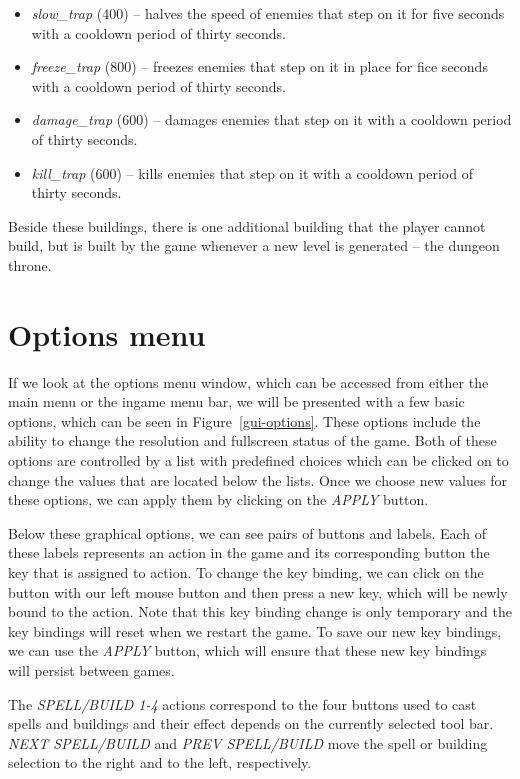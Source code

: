 \begin{itemize}
        \footnote{By \emph{cooldown period} we refer to the amount of time between two applications of the trap's effects.}
        of thirty seconds.
    \item \emph{slow\_trap} (400) -- halves the speed of enemies that step on it for five seconds with a cooldown period of thirty seconds.
    \item \emph{freeze\_trap} (800) -- freezes enemies that step on it in place for fice seconds with a cooldown period of thirty seconds.
    \item \emph{damage\_trap} (600) -- damages enemies that step on it with a cooldown period of thirty seconds.
    \item \emph{kill\_trap} (600) -- kills enemies that step on it with a cooldown period of thirty seconds.
\end{itemize}

Beside these buildings, there is one additional building that the player cannot build, but is built by the game whenever a new level is
generated -- the dungeon throne.

\section{Options menu}

If we look at the options menu window, which can be accessed from either the main menu or the ingame menu bar, we will be presented with a
few basic options, which can be seen in Figure~\ref{gui-options}. These
options include the ability to change the resolution and fullscreen status of the game. Both of these options are controlled by a list
with predefined choices which can be clicked on to change the values that are located below the lists.
Once we choose new values for these options, we can apply them by clicking on the \emph{APPLY} button.

Below these graphical options, we can see pairs of buttons and labels. Each of these labels represents an action in the game and its
corresponding button the key that is assigned to action. To change the key binding, we can click on the button with our left mouse button
and then press a new key, which will be newly bound to the action. Note that this key binding change is only temporary and the key bindings
will reset when we restart the game. To save our new key bindings, we can use the \emph{APPLY} button, which will ensure that these new
key bindings will persist between games.

The \emph{SPELL/BUILD 1-4} actions correspond to the four buttons used to cast spells and buildings and their effect depends on the
currently selected tool bar. \emph{NEXT SPELL/BUILD} and \emph{PREV SPELL/BUILD} move the spell or building selection to the right and
to the left, respectively.

